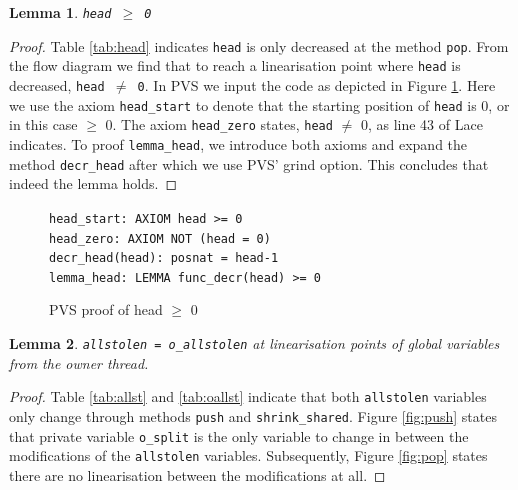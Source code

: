 \documentclass{sig-alternate-br}
\newtheorem{lemma}{Lemma}
\begin{document}
\begin{lemma}
	\texttt{head $\geq$ 0}
	\label{lem:headzero}
\end{lemma}
\begin{proof}
	Table \ref{tab:head} indicates \texttt{head} is only decreased at the method \texttt{pop}.
	From the flow diagram we find that to reach a linearisation point where \texttt{head} is decreased, \texttt{head $\neq$ 0}.
	In PVS we input the code as depicted in Figure \ref{pvs:headzero}.
	Here we use the axiom \texttt{head\_start} to denote that the starting position of \texttt{head} is 0, or in this case $\geq$ 0.
	The axiom \texttt{head\_zero} states, \texttt{head} $\neq$ 0, as line 43 of Lace indicates.
	To proof \texttt{lemma\_head}, we introduce both axioms and expand the method \texttt{decr\_head} after which we use PVS' grind option.
	This concludes that indeed the lemma holds.
\end{proof}
\begin{figure}[h]
	\texttt{head\_start: AXIOM head >= 0}\\
	\texttt{head\_zero: AXIOM NOT (head = 0)}\\
	\texttt{decr\_head(head): posnat = head-1}\\
	\texttt{lemma\_head: LEMMA func\_decr(head) >= 0}
	\caption{PVS proof of head $\geq$ 0}
	\label{pvs:headzero}
\end{figure}

\begin{lemma}
	\texttt{allstolen = o\_allstolen} at linearisation points of global variables from the owner thread.
\end{lemma}
\begin{proof}
	Table \ref{tab:allst} and \ref{tab:oallst} indicate that both \texttt{allstolen} variables only change through methods \texttt{push} and \texttt{shrink\_shared}. Figure \ref{fig:push} states that private variable \texttt{o\_split} is the only variable to change in between the modifications of the \texttt{allstolen} variables. Subsequently, Figure \ref{fig:pop} states there are no linearisation between the modifications at all.
\end{proof}
\end{document}
